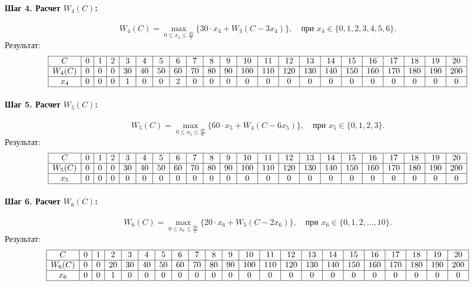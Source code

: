 \documentclass{article}
\begin{document}
\paragraph*{Шаг 4. Расчет $W_4(C)$:}
\[
    W_4(C) = \max_{0 \leq x_4 \leq \frac{20}{3}} \{ 30 \cdot x_4 + W_3(C - 3 x_4) \}, \quad \text{при } x_4 \in \{0, 1, 2, 3, 4, 5, 6\}.
\]
Результат:
\[
    \begin{array}{|c|c|c|c|c|c|c|c|c|c|c|c|c|c|c|c|c|c|c|c|c|c|}
        \hline
        C      & 0 & 1 & 2 & 3  & 4  & 5  & 6  & 7  & 8  & 9  & 10  & 11  & 12  & 13  & 14  & 15  & 16  & 17  & 18  & 19  & 20  \\
        \hline
        W_4(C) & 0 & 0 & 0 & 30 & 40 & 50 & 60 & 70 & 80 & 90 & 100 & 110 & 120 & 130 & 140 & 150 & 160 & 170 & 180 & 190 & 200 \\
        \hline
        x_4    & 0 & 0 & 0 & 1  & 0  & 0  & 2  & 0  & 0  & 0  & 0   & 0   & 0   & 0   & 0   & 0   & 0   & 0   & 0   & 0   & 0   \\
        \hline
    \end{array}
\]

\paragraph*{Шаг 5. Расчет $W_5(C)$:}
\[
    W_5(C) = \max_{0 \leq x_5 \leq \frac{20}{6}} \{ 60 \cdot x_5 + W_4(C - 6 x_5) \}, \quad \text{при } x_5 \in \{0, 1, 2, 3\}.
\]
Результат:
\[
    \begin{array}{|c|c|c|c|c|c|c|c|c|c|c|c|c|c|c|c|c|c|c|c|c|c|}
        \hline
        C      & 0 & 1 & 2 & 3  & 4  & 5  & 6  & 7  & 8  & 9  & 10  & 11  & 12  & 13  & 14  & 15  & 16  & 17  & 18  & 19  & 20  \\
        \hline
        W_5(C) & 0 & 0 & 0 & 30 & 40 & 50 & 60 & 70 & 80 & 90 & 100 & 110 & 120 & 130 & 140 & 150 & 160 & 170 & 180 & 190 & 200 \\
        \hline
        x_5    & 0 & 0 & 0 & 0  & 0  & 0  & 0  & 0  & 0  & 0  & 0   & 0   & 0   & 0   & 0   & 0   & 0   & 0   & 0   & 0   & 0   \\
        \hline
    \end{array}
\]

\paragraph*{Шаг 6. Расчет $W_6(C)$:}
\[
    W_6(C) = \max_{0 \leq x_6 \leq \frac{20}{2}} \{ 20 \cdot x_6 + W_5(C - 2 x_6) \}, \quad \text{при } x_6 \in \{0, 1, 2, \dots, 10\}.
\]
Результат:
\[
    \begin{array}{|c|c|c|c|c|c|c|c|c|c|c|c|c|c|c|c|c|c|c|c|c|c|}
        \hline
        C      & 0 & 1 & 2  & 3  & 4  & 5  & 6  & 7  & 8  & 9  & 10  & 11  & 12  & 13  & 14  & 15  & 16  & 17  & 18  & 19  & 20  \\
        \hline
        W_6(C) & 0 & 0 & 20 & 30 & 40 & 50 & 60 & 70 & 80 & 90 & 100 & 110 & 120 & 130 & 140 & 150 & 160 & 170 & 180 & 190 & 200 \\
        \hline
        x_6    & 0 & 0 & 1  & 0  & 0  & 0  & 0  & 0  & 0  & 0  & 0   & 0   & 0   & 0   & 0   & 0   & 0   & 0   & 0   & 0   & 0   \\
        \hline
    \end{array}
\]
\end{document}
